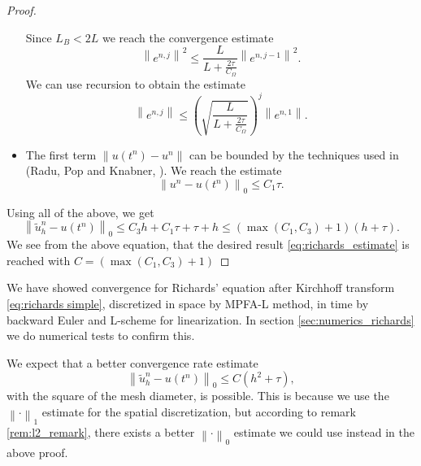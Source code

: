 \documentclass[../Main/main.tex]{subfiles}
\begin{document}
\begin{proof}
\begin{itemize}
		Since $L_B < 2L$ we reach the convergence estimate
		\begin{equation}
\left \|e^{n,j}\right \|^2 \leq \frac{L}{L+\frac{2\tau}{C_{\Omega}}}\left \|e^{n,j-1}\right \|^2.
		\end{equation}
		We can use recursion to obtain the estimate
		\begin{equation}
			\left \|e^{n,j}\right \| \leq \left(\sqrt{\frac{L}{L+\frac{2\tau}{C_{\Omega}}}} \right)^j  \left \|e^{n,1}\right \|.
		\end{equation}
		\item The first term $\left \| u(t^n)-u^n\right \|$ can be bounded by the techniques used in (Radu, Pop and Knabner, \cite{FlorinTimeConvergence}). We reach the estimate
		\begin{equation}
			\left \| u^n-u(t^n)\right \|_0 \leq C_1 \tau.
		\end{equation}
		
		\end{itemize}
	Using all of the above, we get
	\begin{equation}
		\left \|\tilde{u}_h^{n}-u(t^n)\right \|_0 \leq C_3 h + C_1 \tau + \tau + h \leq (\max(C_1,C_3)+1)(h+\tau).
	\end{equation}
	We see from the above equation, that the desired result \eqref{eq:richards_estimate} is reached with $C=(\max(C_1,C_3)+1)$
	\end{proof}
	We have showed convergence for Richards' equation after Kirchhoff transform \eqref{eq:richards simple},  discretized in space by MPFA-L method, in time by backward Euler and L-scheme for linearization. In section \ref{sec:numerics_richards} we do numerical tests to confirm this.
	\begin{remark}
		We expect that a better convergence rate estimate 
		\begin{equation}
			\left \|\tilde{u}_h^{n}-u(t^n)\right \|_0 \leq C (h^2+\tau),
		\end{equation}
		with the square of the mesh diameter, is possible. This is because we use the $\left\|\cdot\right\|_1$ estimate for the spatial discretization, but according to remark \ref{rem:l2_remark}, there exists a better $\left\|\cdot\right\|_0$ estimate we could use instead in the above proof.
	\end{remark}
	
\end{document}
